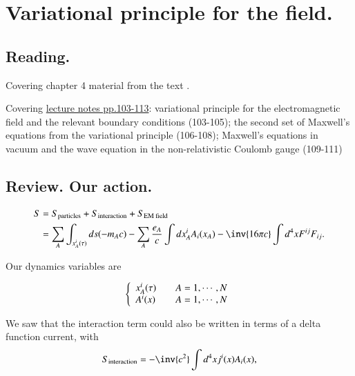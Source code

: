 %
%

\chapter{Variational principle for the field.}
\label{chap:relativisticElectrodynamicsL13}
{}
\date{Feb 15, 2011}

\beginArtNoToc

\section{Reading.}

Covering chapter 4 material from the text \citep{landau1980classical}.

Covering \href{http://www.physics.utoronto.ca/~poppitz/epoppitz/PHY450_files/RelEMpp103-113.pdf}{lecture notes pp.103-113}: variational principle for the electromagnetic field and the relevant boundary conditions (103-105); the second set of Maxwell's equations from the variational principle (106-108); Maxwell's equations in vacuum and the wave equation in the non-relativistic Coulomb gauge (109-111)

\section{Review.  Our action.}

\begin{align*}
S
&= S_{\text{particles}} + S_{\text{interaction}} + S_{\text{EM field}} \\
&= \sum_A \int_{x_A^i(\tau)} ds ( -m_A c )
- \sum_A
\frac{e_A}{c}
\int dx_A^i A_i(x_A)
- \inv{16 \pi c} \int d^4 x F^{ij } F_{ij}.
\end{align*}

Our dynamics variables are

\begin{equation}\label{eqn:relativisticElectrodynamicsL13:30}
\left\{
\begin{array}{l l}
x_A^i(\tau) & \quad \mbox{$A = 1, \cdots, N$} \\
A^i(x) & \quad \mbox{$A = 1, \cdots, N$}
\end{array}
\right.
\end{equation}

We saw that the interaction term could also be written in terms of a delta function current, with
\begin{equation}\label{eqn:relativisticElectrodynamicsL13:50}
S_{\text{interaction}}
= -\inv{c^2} \int d^4x j^i(x) A_i(x),
\end{equation}

